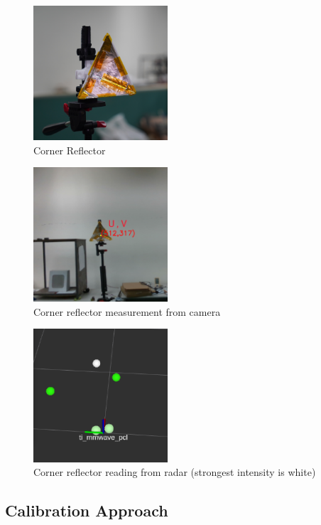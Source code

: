 \begin{figure}[hpbt]
    \centering
    \includegraphics[width=5cm]{Figures/corner_reflector.jpg}%
    \caption{Corner Reflector}
    \label{fig:corner_reflector_fig}
\end{figure}
\begin{figure}[hpbt]
    \centering
    \includegraphics[width=5cm]{Figures/camera_corner.png}%
    \caption{Corner reflector measurement from camera}
    \label{fig:camera_view_fig}
\end{figure}
\begin{figure}[hpbt]
    \centering
    \includegraphics[width=5cm]{Figures/radar_corner.png}%
    \caption{Corner reflector reading from radar (strongest intensity is white)}
    \label{fig:radar_view_fig}
\end{figure}
\fi
\newpage
\subsection{Calibration Approach}\label{subsec:2-1-data_collect}

